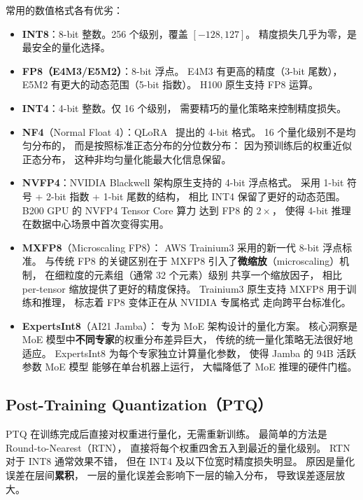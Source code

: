 常用的数值格式各有优劣：
\begin{itemize}[noitemsep]
  \item \textbf{INT8}：8-bit 整数。256 个级别，覆盖 $[-128, 127]$。
        精度损失几乎为零，是最安全的量化选择。
  \item \textbf{FP8（E4M3/E5M2）}：8-bit 浮点。
        E4M3 有更高的精度（3-bit 尾数），E5M2 有更大的动态范围（5-bit 指数）。
        H100 原生支持 FP8 运算。
  \item \textbf{INT4}：4-bit 整数。仅 16 个级别，
        需要精巧的量化策略来控制精度损失。
  \item \textbf{NF4}（Normal Float 4）：QLoRA~\cite{dettmers2023qlora} 提出的 4-bit 格式。
        16 个量化级别不是均匀分布的，
        而是按照标准正态分布的分位数分布：
        因为预训练后的权重近似正态分布，
        这种非均匀量化能最大化信息保留。
  \item \textbf{NVFP4}：NVIDIA Blackwell 架构原生支持的 4-bit 浮点格式。
        采用 1-bit 符号 + 2-bit 指数 + 1-bit 尾数的结构，
        相比 INT4 保留了更好的动态范围。
        B200 GPU 的 NVFP4 Tensor Core 算力
        达到 FP8 的 $2\times$，
        使得 4-bit 推理在数据中心场景中首次变得实用。
  \item \textbf{MXFP8}（Microscaling FP8）：
        AWS Trainium3 采用的新一代 8-bit 浮点标准。
        与传统 FP8 的关键区别在于
        MXFP8 引入了\textbf{微缩放}（microscaling）机制，
        在细粒度的元素组（通常 32 个元素）级别
        共享一个缩放因子，
        相比 per-tensor 缩放提供了更好的精度保持。
        Trainium3 原生支持 MXFP8 用于训练和推理，
        标志着 FP8 变体正在从 NVIDIA 专属格式
        走向跨平台标准化。
  \item \textbf{ExpertsInt8}（AI21 Jamba）：
        专为 MoE 架构设计的量化方案。
        核心洞察是 MoE 模型中\textbf{不同专家}的权重分布差异巨大，
        传统的统一量化策略无法很好地适应。
        ExpertsInt8 为每个专家独立计算量化参数，
        使得 Jamba 的 94B 活跃参数 MoE 模型
        能够在单台机器上运行，
        大幅降低了 MoE 推理的硬件门槛。
\end{itemize}

\subsection{Post-Training Quantization（PTQ）}

PTQ 在训练完成后直接对权重进行量化，无需重新训练。
最简单的方法是 Round-to-Nearest（RTN），
直接将每个权重四舍五入到最近的量化级别。
RTN 对于 INT8 通常效果不错，
但在 INT4 及以下位宽时精度损失明显。
原因是量化误差在层间\textbf{累积}，
一层的量化误差会影响下一层的输入分布，
导致误差逐层放大。

